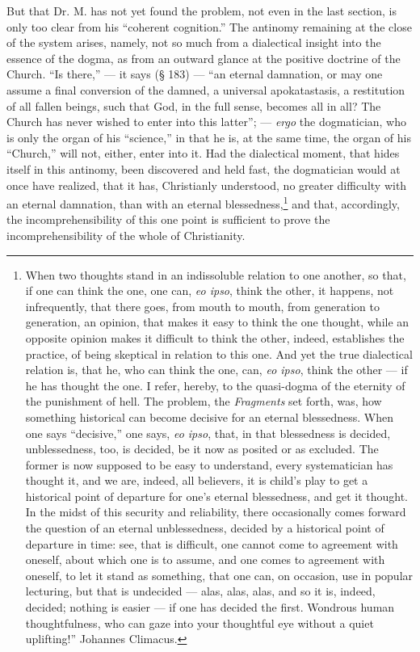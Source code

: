 \documentclass[12pt]{book}
\begin{document}
But that Dr. M. has not yet found the problem, not even in the last section, is only too clear from his ``coherent cognition.'' The antinomy remaining at the close of the system arises, namely, not so much from a dialectical insight into the essence of the dogma, as from an outward glance at the positive doctrine of the Church. ``Is there,'' --- it says (§ 183) --- ``an eternal damnation, or may one assume a final conversion of the damned, a universal apokatastasis, a restitution of all fallen beings, such that God, in the full sense, becomes all in all? The Church has never wished to enter into this latter''; --- \textit{ergo} the dogmatician, who
is only the organ of his ``science,'' in that he is, at the same time, the organ of his ``Church,'' will not, either, enter into it. Had the dialectical moment, that hides itself in this antinomy, been discovered and held fast, the dogmatician would at once have realized, that it has, Christianly understood, no greater difficulty with an eternal damnation, than with an eternal blessedness,\footnote{When two thoughts stand in an indissoluble relation to one another, so that, if one can think the one, one can, \textit{eo ipso}, think the other, it happens, not infrequently, that there goes, from mouth to mouth, from generation to generation, an opinion, that makes it easy to think the one thought, while an opposite opinion makes it difficult to think the other, indeed, establishes the practice, of being skeptical in relation to this one. And yet the true dialectical relation is, that he, who can think the one, can, \textit{eo ipso}, think the other --- if he has thought the one. I refer, hereby, to the quasi-dogma of the eternity of the punishment of hell. The problem, the \textit{Fragments} set forth, was, how something historical can become decisive for an eternal blessedness. When one says ``decisive,'' one says, \textit{eo ipso}, that, in that blessedness is decided, unblessedness, too, is decided, be it now as posited or as excluded. The former is now supposed to be easy to understand, every systematician has thought it, and we are, indeed, all believers, it is child's play to get a historical point of departure for one's eternal blessedness, and get it thought. In the midst of this security and reliability, there occasionally comes forward the question of an eternal unblessedness, decided by a historical point of departure in time: see, that is difficult, one cannot come to agreement with oneself, about which one is to assume, and one comes to agreement with oneself, to let it stand as something, that one
can, on occasion, use in popular lecturing, but that is undecided --- alas, alas, alas, and so it is, indeed, decided; nothing is easier --- if one has decided the first. Wondrous human thoughtfulness, who can gaze into your thoughtful eye without a quiet uplifting!'' Johannes Climacus.} and that, accordingly, the incomprehensibility of this one point is sufficient to prove the incomprehensibility of the whole of Christianity.
\end{document}
